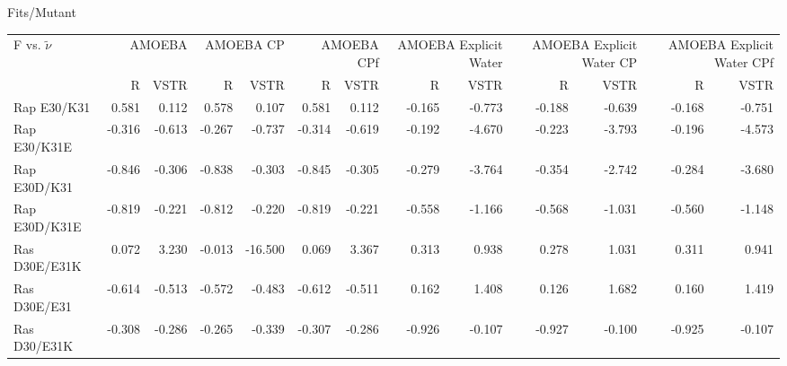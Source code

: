 \documentclass[landscape]{article}
\begin{document}
	
	
Fits/Mutant \\
{
\begin{tabular}{ l || r r | r r | r r | r r| r r | r r}
F vs. $\tilde \nu$ & \multicolumn{2}{|C{2cm}}{AMOEBA} & \multicolumn{2}{|C{2cm}}{AMOEBA CP} & \multicolumn{2}{|C{2cm}}{AMOEBA CPf} & \multicolumn{2}{|C{2cm}}{AMOEBA Explicit Water} & \multicolumn{2}{|C{2cm}}{AMOEBA Explicit Water CP} & \multicolumn{2}{|C{2cm}}{AMOEBA Explicit Water CPf} \\
 & \multicolumn{1}{|C{1cm}}{R} & \multicolumn{1}{C{1cm}}{VSTR} & \multicolumn{1}{|C{1cm}}{R} & \multicolumn{1}{C{1cm}}{VSTR} & \multicolumn{1}{|C{1cm}}{R} & \multicolumn{1}{C{1cm}}{VSTR}  & \multicolumn{1}{|C{1cm}}{R} & \multicolumn{1}{C{1cm}}{VSTR} & \multicolumn{1}{|C{1cm}}{R} & \multicolumn{1}{C{1cm}}{VSTR} & \multicolumn{1}{|C{1cm}}{R} & \multicolumn{1}{C{1cm}}{VSTR} \\
\hline\hline	
Rap E30/K31    & 0.581          & 0.112          & 0.578          & 0.107          & 0.581          & 0.112          & -0.165         & -0.773         & -0.188         & -0.639         & -0.168         & -0.751        \\
Rap E30/K31E   & -0.316         & -0.613         & -0.267         & -0.737         & -0.314         & -0.619         & -0.192         & -4.670         & -0.223         & -3.793         & -0.196         & -4.573        \\
Rap E30D/K31   & -0.846         & -0.306         & -0.838         & -0.303         & -0.845         & -0.305         & -0.279         & -3.764         & -0.354         & -2.742         & -0.284         & -3.680        \\
Rap E30D/K31E  & -0.819         & -0.221         & -0.812         & -0.220         & -0.819         & -0.221         & -0.558         & -1.166         & -0.568         & -1.031         & -0.560         & -1.148        \\
Ras D30E/E31K  & 0.072          & 3.230          & -0.013         & -16.500        & 0.069          & 3.367          & 0.313          & 0.938          & 0.278          & 1.031          & 0.311          & 0.941         \\
Ras D30E/E31   & -0.614         & -0.513         & -0.572         & -0.483         & -0.612         & -0.511         & 0.162          & 1.408          & 0.126          & 1.682          & 0.160          & 1.419         \\
Ras D30/E31K   & -0.308         & -0.286         & -0.265         & -0.339         & -0.307         & -0.286         & -0.926         & -0.107         & -0.927         & -0.100         & -0.925         & -0.107        \\

\end{tabular}}
\end{document}
